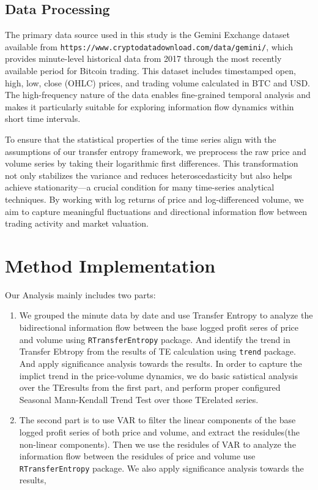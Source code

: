 \documentclass{article}
\begin{document}
\subsection{Data  Processing}
The primary data source used in this study is the Gemini Exchange dataset available from \texttt{https://www.cryptodatadownload.com/data/gemini/}, which provides minute-level historical data from 2017 through the most recently available period for Bitcoin trading. This dataset includes timestamped open, high, low, close (OHLC) prices, and trading volume calculated in BTC and USD. The high-frequency nature of the data enables fine-grained temporal analysis and makes it particularly suitable for exploring information flow dynamics within short time intervals.

To ensure that the statistical properties of the time series align with the assumptions of our transfer entropy framework, we preprocess the raw price and volume series by taking their logarithmic first differences. This transformation not only stabilizes the variance and reduces heteroscedasticity but also helps achieve stationarity—a crucial condition for many time-series analytical techniques. By working with log returns of price and log-differenced volume, we aim to capture meaningful fluctuations and directional information flow between trading activity and market valuation.

\section{Method Implementation}
Our Analysis mainly includes two parts:
\begin{enumerate}
    \item We grouped the minute data by date and use Transfer Entropy to analyze the bidirectional information flow between the base logged profit seres of price and volume using \texttt{RTransferEntropy} package. And identify the trend in Transfer Ebtropy from the results of TE calculation using \texttt{trend} package. And apply significance analysis towards the results. In order to capture the implict trend in the price-volume dynamics, we do basic satistical analysis over the TEresults from the first part, and perform proper configured Seasonal Mann-Kendall Trend Test over those TErelated series.
    \item The second part is to use VAR to filter the linear components of the base logged profit series of both price and volume, and extract the residules(the non-linear components). Then we use the residules of VAR to analyze the information flow between the residules of price and volume use \texttt{RTransferEntropy} package. We also apply significance analysis towards the results, 
\end{enumerate}
\end{document}
